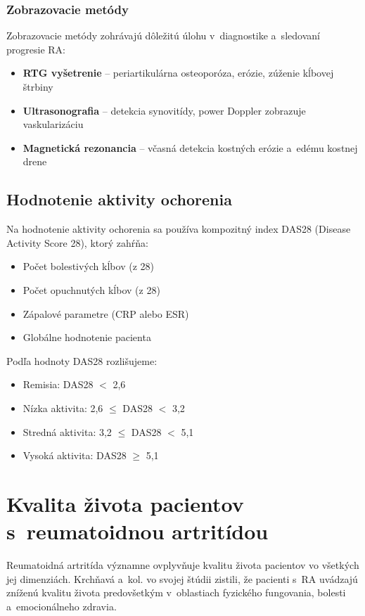 \subsubsection{Zobrazovacie metódy}

Zobrazovacie metódy zohrávajú dôležitú úlohu v~diagnostike a~sledovaní progresie RA:
\begin{itemize}
    \item \textbf{RTG vyšetrenie} -- periartikulárna osteoporóza, erózie, zúženie kĺbovej štrbiny
    \item \textbf{Ultrasonografia} -- detekcia synovitídy, power Doppler zobrazuje vaskularizáciu
    \item \textbf{Magnetická rezonancia} -- včasná detekcia kostných erózie a~edému kostnej drene \parencite{Olejarova2016}
\end{itemize}

\subsection{Hodnotenie aktivity ochorenia}

Na hodnotenie aktivity ochorenia sa používa kompozitný index DAS28 (Disease Activity Score 28), ktorý zahŕňa:
\begin{itemize}
    \item Počet bolestivých kĺbov (z 28)
    \item Počet opuchnutých kĺbov (z 28)
    \item Zápalové parametre (CRP alebo ESR)
    \item Globálne hodnotenie pacienta \parencite{smolen2018}
\end{itemize}

Podľa hodnoty DAS28 rozlišujeme:
\begin{itemize}
    \item Remisia: DAS28 $<$ 2,6
    \item Nízka aktivita: 2,6 $\leq$ DAS28 $<$ 3,2
    \item Stredná aktivita: 3,2 $\leq$ DAS28 $<$ 5,1
    \item Vysoká aktivita: DAS28 $\geq$ 5,1
\end{itemize}

\section{Kvalita života pacientov s~reumatoidnou artritídou}

Reumatoidná artritída významne ovplyvňuje kvalitu života pacientov vo všetkých jej dimenziách. Krchňavá a~kol. \parencite*{Krchnava2018} vo svojej štúdii zistili, že pacienti s~RA uvádzajú zníženú kvalitu života predovšetkým v~oblastiach fyzického fungovania, bolesti a~emocionálneho zdravia.

